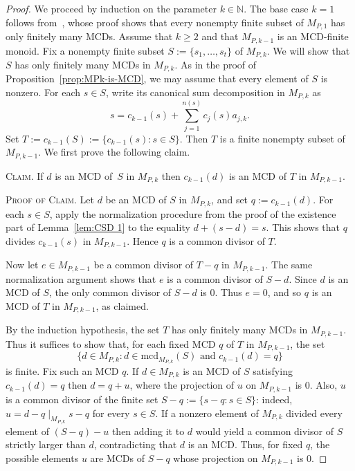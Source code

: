 \documentclass[10pt]{amsart}
\theoremstyle{definition}
\theoremstyle{remark}
\numberwithin{equation}{section}
\newcommand{\nn}{\mathbb{N}}
\newcommand{\mcd}{\mathrm{mcd}}
\begin{document}
\begin{proof}
  We proceed by induction on the parameter $k \in \nn$. The base case $k=1$ follows from~\cite[Theorem~5.3]{LWZ24}, whose proof shows that every nonempty finite subset of $M_{P,1}$ has only finitely many MCDs. Assume that $k \ge 2$ and that $M_{P,k-1}$ is an MCD-finite monoid. Fix a nonempty finite subset $S := \{s_1, \dots, s_t\}$ of $M_{P,k}$. We will show that $S$ has only finitely many MCDs in $M_{P,k}$. As in the proof of Proposition~\ref{prop:MPk-is-MCD}, we may assume that every element of $S$ is nonzero. For each $s \in S$, write its canonical sum decomposition in $M_{P,k}$ as
  \[
    s = c_{k-1}(s) + \sum_{j=1}^{n(s)} c_j(s) a_{j,k}.
  \]
  Set $T := c_{k-1}(S) := \{c_{k-1}(s) : s \in S\}$. Then $T$ is a finite nonempty subset of $M_{P,k-1}$. We first prove the following claim.
  \smallskip

  \noindent \textsc{Claim.} If $d$ is an MCD of~$S$ in $M_{P,k}$ then $c_{k-1}(d)$ is an MCD of $T$ in $M_{P,k-1}$.
  \smallskip

  \noindent \textsc{Proof of Claim.} Let $d$ be an MCD of $S$ in $M_{P,k}$, and set $q := c_{k-1}(d)$. For each $s \in S$, apply the normalization procedure from the proof of the existence part of Lemma~\ref{lem:CSD 1} to the equality $d+(s-d)=s$. This shows that $q$ divides $c_{k-1}(s)$ in $M_{P,k-1}$. Hence $q$ is a common divisor of $T$.

  Now let $e \in M_{P,k-1}$ be a common divisor of $T-q$ in $M_{P,k-1}$. The same normalization argument shows that $e$ is a common divisor of $S-d$. Since $d$ is an MCD of $S$, the only common divisor of $S-d$ is $0$. Thus $e=0$, and so $q$ is an MCD of $T$ in $M_{P,k-1}$, as claimed.
  \smallskip

  By the induction hypothesis, the set $T$ has only finitely many MCDs in $M_{P,k-1}$. Thus it suffices to show that, for each fixed MCD $q$ of $T$ in $M_{P,k-1}$, the set
  \[
    \{ d \in M_{P,k} : d \in \mcd_{M_{P,k}}(S) \text{ and } c_{k-1}(d) = q \}
  \]
  is finite. Fix such an MCD $q$. If $d \in M_{P,k}$ is an MCD of $S$ satisfying $c_{k-1}(d)=q$ then $d=q+u$, where the projection of $u$ on $M_{P,k-1}$ is $0$. Also, $u$ is a common divisor of the finite set $S-q := \{s-q : s \in S\}$: indeed, $u=d-q \mid_{M_{P,k}} s-q$ for every $s \in S$. If a nonzero element of $M_{P,k}$ divided every element of $(S-q)-u$ then adding it to $d$ would yield a common divisor of $S$ strictly larger than $d$, contradicting that $d$ is an MCD. Thus, for fixed $q$, the possible elements $u$ are MCDs of $S-q$ whose projection on $M_{P,k-1}$ is $0$.


\end{proof}
\end{document}
